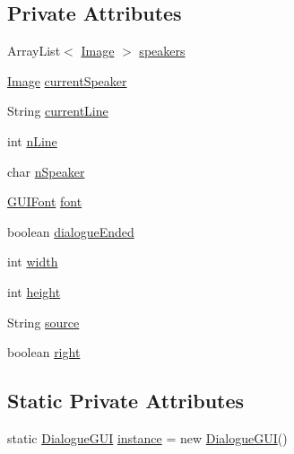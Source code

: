 \subsection*{Private Attributes}
\begin{DoxyCompactItemize}
\item 
Array\+List$<$ \mbox{\hyperlink{classorg_1_1newdawn_1_1slick_1_1_image}{Image}} $>$ \mbox{\hyperlink{classgui_1_1_dialogue_g_u_i_a11fc12409bfacfca3a0544bd49a75035}{speakers}}
\item 
\mbox{\hyperlink{classorg_1_1newdawn_1_1slick_1_1_image}{Image}} \mbox{\hyperlink{classgui_1_1_dialogue_g_u_i_a8115ee094decde84cada17b49ef77375}{current\+Speaker}}
\item 
String \mbox{\hyperlink{classgui_1_1_dialogue_g_u_i_a44a2c9abf9ce5527b307a1828266d199}{current\+Line}}
\item 
int \mbox{\hyperlink{classgui_1_1_dialogue_g_u_i_a1270df90f92a6329173e530568d8a81d}{n\+Line}}
\item 
char \mbox{\hyperlink{classgui_1_1_dialogue_g_u_i_ac78eeb2127202391a39c827cee6dfd2f}{n\+Speaker}}
\item 
\mbox{\hyperlink{classgui_1_1_g_u_i_font}{G\+U\+I\+Font}} \mbox{\hyperlink{classgui_1_1_dialogue_g_u_i_a045cc33fd00133f73a614eb061a07d2f}{font}}
\item 
boolean \mbox{\hyperlink{classgui_1_1_dialogue_g_u_i_a0ce37741e9f2b0ad3a749977fe9a1477}{dialogue\+Ended}}
\item 
int \mbox{\hyperlink{classgui_1_1_dialogue_g_u_i_a62770f57482703fba82e5e885b8f60cc}{width}}
\item 
int \mbox{\hyperlink{classgui_1_1_dialogue_g_u_i_a41a3d504adf0501b3c0b15ce1f046fa8}{height}}
\item 
String \mbox{\hyperlink{classgui_1_1_dialogue_g_u_i_ae6b546f672ac2bbfc0a9f5105ce9e2a9}{source}}
\item 
boolean \mbox{\hyperlink{classgui_1_1_dialogue_g_u_i_ac2baedad2d743cda7bc77fcb71ad1466}{right}}
\end{DoxyCompactItemize}
\subsection*{Static Private Attributes}
\begin{DoxyCompactItemize}
\item 
static \mbox{\hyperlink{classgui_1_1_dialogue_g_u_i}{Dialogue\+G\+UI}} \mbox{\hyperlink{classgui_1_1_dialogue_g_u_i_a1e0fe0a2da8282c913f294972362bbfe}{instance}} = new \mbox{\hyperlink{classgui_1_1_dialogue_g_u_i}{Dialogue\+G\+UI}}()
\end{DoxyCompactItemize}


